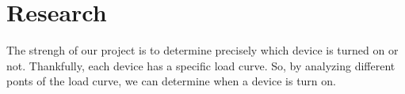 %
%
\section{Research}

The strengh of our project is to determine precisely which device is turned on or not. Thankfully, each device has a specific load curve. So, by analyzing different ponts of the load curve, we can determine when a device is turn on.




